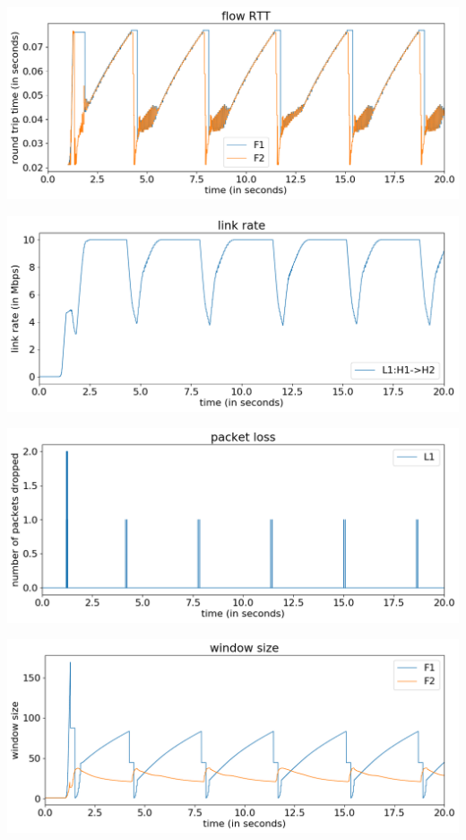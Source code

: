 \documentclass{article}
\begin{document}
\includegraphics[width = \textwidth]{"test_case3 flow RTT"}

\includegraphics[width = \textwidth]{"test_case3 link rate"}

\includegraphics[width = \textwidth]{"test_case3 packet loss"}

\includegraphics[width = \textwidth]{"test_case3 window size"}
\end{document}
